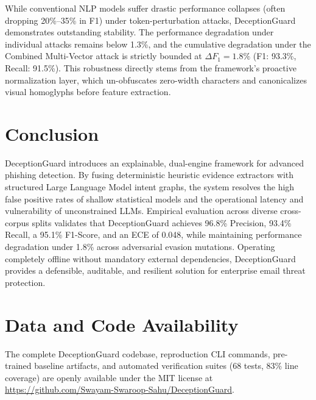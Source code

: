 \documentclass{ieeeaccess}
\begin{document}
While conventional NLP models suffer drastic performance collapses (often dropping 20\%--35\% in F1) under token-perturbation attacks, DeceptionGuard demonstrates outstanding stability. The performance degradation under individual attacks remains below 1.3\%, and the cumulative degradation under the Combined Multi-Vector attack is strictly bounded at $\Delta F_1 = 1.8\%$ (F1: 93.3\%, Recall: 91.5\%). This robustness directly stems from the framework's proactive normalization layer, which un-obfuscates zero-width characters and canonicalizes visual homoglyphs before feature extraction.

\section{Conclusion}
\label{sec:conclusion}
DeceptionGuard introduces an explainable, dual-engine framework for advanced phishing detection. By fusing deterministic heuristic evidence extractors with structured Large Language Model intent graphs, the system resolves the high false positive rates of shallow statistical models and the operational latency and vulnerability of unconstrained LLMs. Empirical evaluation across diverse cross-corpus splits validates that DeceptionGuard achieves 96.8\% Precision, 93.4\% Recall, a 95.1\% F1-Score, and an ECE of 0.048, while maintaining performance degradation under 1.8\% across adversarial evasion mutations. Operating completely offline without mandatory external dependencies, DeceptionGuard provides a defensible, auditable, and resilient solution for enterprise email threat protection.

\section*{Data and Code Availability}
The complete DeceptionGuard codebase, reproduction CLI commands, pre-trained baseline artifacts, and automated verification suites (68 tests, 83\% line coverage) are openly available under the MIT license at \url{https://github.com/Swayam-Swaroop-Sahu/DeceptionGuard}.
\end{document}
